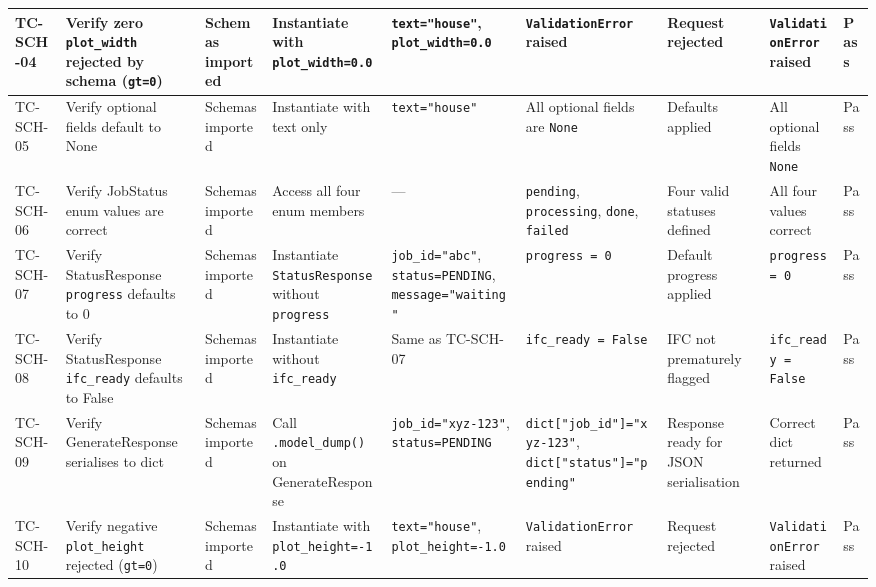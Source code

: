 \begin{landscape}
\begin{longtable}{|p{1.4cm}|p{3.2cm}|p{2.8cm}|p{2.8cm}|p{2.8cm}|p{2.8cm}|p{2.6cm}|p{2.8cm}|p{1.0cm}|}
\rowcolor{passgreen}
TC-SCH-04 & Verify zero \texttt{plot\_width} rejected by schema (\texttt{gt=0}) & Schemas imported & Instantiate with \texttt{plot\_width=0.0} & \texttt{text="house"}, \texttt{plot\_width=0.0} & \texttt{ValidationError} raised & Request rejected & \texttt{ValidationError} raised & Pass \\ \hline

\rowcolor{passgreen}
TC-SCH-05 & Verify optional fields default to None & Schemas imported & Instantiate with text only & \texttt{text="house"} & All optional fields are \texttt{None} & Defaults applied & All optional fields \texttt{None} & Pass \\ \hline

\rowcolor{passgreen}
TC-SCH-06 & Verify JobStatus enum values are correct & Schemas imported & Access all four enum members & — & \texttt{pending}, \texttt{processing}, \texttt{done}, \texttt{failed} & Four valid statuses defined & All four values correct & Pass \\ \hline

\rowcolor{passgreen}
TC-SCH-07 & Verify StatusResponse \texttt{progress} defaults to 0 & Schemas imported & Instantiate \texttt{StatusResponse} without \texttt{progress} & \texttt{job\_id="abc"}, \texttt{status=PENDING}, \texttt{message="waiting"} & \texttt{progress = 0} & Default progress applied & \texttt{progress = 0} & Pass \\ \hline

\rowcolor{passgreen}
TC-SCH-08 & Verify StatusResponse \texttt{ifc\_ready} defaults to False & Schemas imported & Instantiate without \texttt{ifc\_ready} & Same as TC-SCH-07 & \texttt{ifc\_ready = False} & IFC not prematurely flagged & \texttt{ifc\_ready = False} & Pass \\ \hline

\rowcolor{passgreen}
TC-SCH-09 & Verify GenerateResponse serialises to dict & Schemas imported & Call \texttt{.model\_dump()} on GenerateResponse & \texttt{job\_id="xyz-123"}, \texttt{status=PENDING} & \texttt{dict["job\_id"]="xyz-123"}, \texttt{dict["status"]="pending"} & Response ready for JSON serialisation & Correct dict returned & Pass \\ \hline

\rowcolor{passgreen}
TC-SCH-10 & Verify negative \texttt{plot\_height} rejected (\texttt{gt=0}) & Schemas imported & Instantiate with \texttt{plot\_height=-1.0} & \texttt{text="house"}, \texttt{plot\_height=-1.0} & \texttt{ValidationError} raised & Request rejected & \texttt{ValidationError} raised & Pass \\ \hline

\end{longtable}
\end{landscape}

